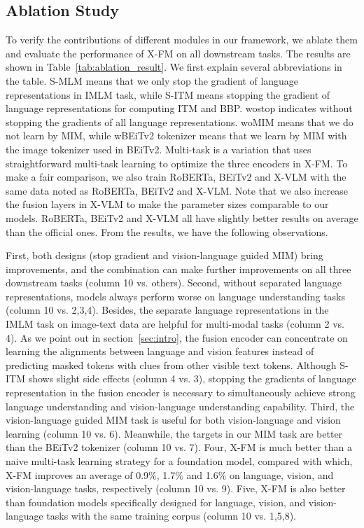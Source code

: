 \documentclass[11pt]{article}
\newcommand{\ModelName}{X-FM\xspace}
\newcommand{\ModelNameB}{X-FM\xspace}
\newcommand{\babyx}{X-VLM}
\begin{document}
\subsection{Ablation Study}
\label{sec:exp_ablation}

To verify the contributions of different modules in our framework, we ablate them and evaluate the performance of {\ModelName} on all downstream tasks. The results are shown in Table~\ref{tab:ablation_result}.
We first explain several abbreviations in the table. S-MLM means that we only stop the gradient of language representations in IMLM task, while S-ITM means stopping the gradient of language representations for computing ITM and BBP. wostop indicates without stopping the gradients of all language representations. woMIM means that we do not learn by MIM, while wBEiTv2 tokenizer means that we learn by MIM with the image tokenizer used in BEiTv2. Multi-task is a variation that uses straightforward multi-task learning to optimize the three encoders in {\ModelName}. To make a fair comparison, we also train RoBERTa, BEiTv2 and {\babyx} with the same data noted as RoBERTa, BEiTv2 and {\babyx}. Note that we also increase the fusion layers in {\babyx} to make the parameter sizes comparable to our models. RoBERTa, BEiTv2 and {\babyx} all have slightly better results on average than the official ones.
From the results, we have the following observations.

First, both designs (stop gradient and vision-language guided MIM) bring improvements, and the combination can make further improvements on all three downstream tasks (column 10 vs. others).
Second, without separated language representations, models always perform worse on language understanding tasks (column 10 vs. 2,3,4). Besides, the separate language representations in the IMLM task on image-text data are helpful for multi-modal tasks (column 2 vs. 4). As we point out in section~\ref{sec:intro}, the fusion encoder can concentrate on learning the alignments between language and vision features instead of predicting masked tokens with clues from other visible text tokens. Although S-ITM shows slight side effects (column 4 vs. 3), stopping the gradients of language representation in the fusion encoder is necessary to simultaneously achieve strong language understanding and vision-language understanding capability.
Third, the vision-language guided MIM task is useful for both vision-language and vision learning (column 10 vs. 6). Meanwhile, the targets in our MIM task are better than the BEiTv2 tokenizer (column 10 vs. 7).
Four, {\ModelName} is much better than a naive multi-task learning strategy for a foundation model, compared with which, {\ModelNameB} improves an average of 0.9\%, 1.7\% and 1.6\% on language, vision, and vision-language tasks, respectively (column 10 vs. 9).
Five, {\ModelName} is also better than foundation models specifically designed for language, vision, and vision-language tasks with the same training corpus (column 10 vs. 1,5,8). \vspace{-0.3em}
\vspace{-0.3em}
\end{document}
